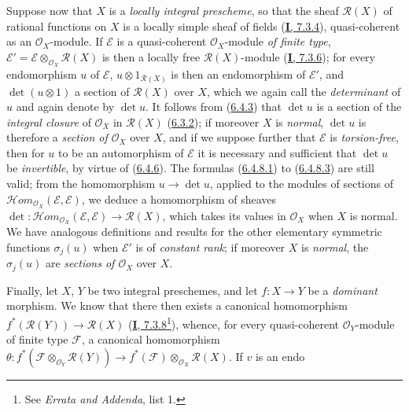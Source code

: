 \begin{env}[6.4.9]
\label{II.6.4.9}
Suppose now that $X$ is a \emph{locally integral prescheme}, so that the
sheaf $\mathcal{R}(X)$ of rational functions on $X$ is a locally simple sheaf
of fields (\hyperref[I.7.3.4]{\textbf{I}, 7.3.4}), quasi-coherent as an
$\mathcal{O}_X$-module. If $\mathcal{E}$ is a quasi-coherent
$\mathcal{O}_X$-module \emph{of finite type},
$\mathcal{E}'=\mathcal{E}\otimes_{\mathcal{O}_X}\mathcal{R}(X)$ is then a
locally free $\mathcal{R}(X)$-module
(\hyperref[I.7.3.6]{\textbf{I}, 7.3.6}); for every endomorphism $u$ of
$\mathcal{E}$, $u\otimes1_{\mathcal{R}(X)}$ is then an endomorphism of
$\mathcal{E}'$, and $\det(u\otimes1)$ a section of $\mathcal{R}(X)$ over
$X$, which we again call the \emph{determinant} of $u$ and again denote by
$\det u$. It follows from (\hyperref[II.6.4.3]{6.4.3}) that $\det u$ is
a section of the \emph{integral closure} of $\mathcal{O}_X$ in
$\mathcal{R}(X)$ (\hyperref[II.6.3.2]{6.3.2}); if moreover $X$ is
\emph{normal}, $\det u$ is therefore a \emph{section of $\mathcal{O}_X$}
over $X$, and if we suppose further that $\mathcal{E}$ is
\emph{torsion-free}, then for $u$ to be an automorphism of $\mathcal{E}$ it
is necessary and sufficient that $\det u$ be \emph{invertible}, by virtue of
(\hyperref[II.6.4.6]{6.4.6}). The formulas
(\hyperref[II.6.4.8.1]{6.4.8.1}) to
(\hyperref[II.6.4.8.3]{6.4.8.3}) are still valid; from the homomorphism
$u\to\det u$, applied to the modules of sections of
$\mathcal{H}om_{\mathcal{O}_X}(\mathcal{E},\mathcal{E})$, we deduce a
homomorphism of sheaves
$\det:\mathcal{H}om_{\mathcal{O}_X}(\mathcal{E},\mathcal{E})
\to\mathcal{R}(X)$, which takes its values in $\mathcal{O}_X$ when $X$ is
normal. We have analogous definitions and results for the other elementary
symmetric functions $\sigma_j(u)$ when $\mathcal{E}'$ is of \emph{constant
rank}; if moreover $X$ is \emph{normal}, the $\sigma_j(u)$ are
\emph{sections of $\mathcal{O}_X$} over $X$.

Finally, let $X$, $Y$ be two integral preschemes, and let $f:X\to Y$ be a
\emph{dominant} morphism. We know that there then exists a canonical
homomorphism $f^*(\mathcal{R}(Y))\to\mathcal{R}(X)$
(\hyperref[I.7.3.8]{\textbf{I}, 7.3.8}\footnote{See \emph{Errata and Addenda},
list 1.}), whence, for every quasi-coherent $\mathcal{O}_Y$-module of
finite type $\mathcal{F}$, a canonical homomorphism
$\theta:f^*(\mathcal{F}\otimes_{\mathcal{O}_Y}\mathcal{R}(Y))
\to f^*(\mathcal{F})\otimes_{\mathcal{O}_X}\mathcal{R}(X)$. If $v$ is an
endo%


\end{env}
